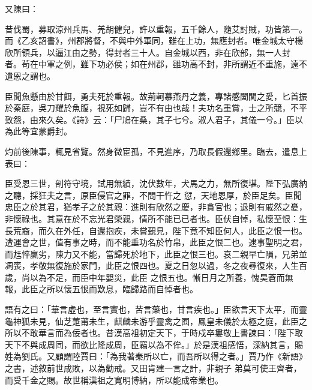 \begin{pinyinscope}
 又陳曰：



 昔伐蜀，募取涼州兵馬、羌胡健兒，許以重報，五千餘人，隨艾討賊，功皆第一。而《乙亥詔書》，州郡將督，不與中外軍同，雖在上功，無應封者。唯金城太守楊欣所領兵，以逼江由之勢，得封者三十人。自金城以西，非在欣部，無一人封
 者。茍在中軍之例，雖下功必侯；如在州郡，雖功高不封，非所謂近不重施，遠不遺恩之謂也。



 臣聞魚懸由於甘餌，勇夫死於重報。故荊軻慕燕丹之義，專諸感闔閭之愛，匕首振於秦庭，吳刀耀於魚腹，視死如歸，豈不有由也哉！夫功名重賞，士之所競，不平致怨，由來久矣。《詩》云：「尸鳩在桑，其子七兮。淑人君子，其儀一兮。」臣以為此等宜蒙爵封。



 灼前後陳事，輒見省覽。然身微宦孤，不見進序，乃取長假還鄉里。臨去，遣息上表曰：



 臣受恩三世，剖符守境，試用無績，沈伏數年，犬馬之力，無所復堪。陛下弘廣納之聽，採狂夫之言，原臣侵官之罪，不問干忤之
 愆，天地恩厚，於臣足矣。臣聞忠臣之於其君，猶孝子之於其親：進則有欣然之慶，非貪官也；退則有戚然之憂，非懷祿也。其意在於不忘光君榮親，情所不能已已者也。臣伏自悼，私懷至恨：生長荒裔，而久在外任，自還抱疾，未嘗覲見，陛下竟不知臣何人，此臣之恨一也。遭運會之世，值有事之時，而不能垂功名於竹帛，此臣之恨二也。逮事聖明之君，而尪悴羸劣，陳力又不能，當歸死於地下，此臣之恨三也。哀二親早亡隕，兄弟並凋喪，孝敬無復施於家門，此臣之恨四也。夏之日忽以過，冬之夜尋復來，人生百歲，尚以為不足，而臣中年嬰災，此臣
 之恨五也。慚日月之所養，愧昊蒼而無報，此臣之所以懷五恨而歎息，臨歸路而自悼者也。



 語有之曰：「華言虛也，至言實也，苦言藥也，甘言疾也。」臣欲言天下太平，而靈龜神狐未見，仙芝萐莆未生，麒麟未游乎靈禽之囿，鳳皇未儀於太極之庭，此臣之所以不敢華言而為佞者也。昔漢高祖初定天下，于時戍卒婁敬上書諫曰：「陛下取天下不與成周同，而欲比隆成周，臣竊以為不侔。」於是漢祖感悟，深納其言，賜姓為劉氏。又顧謂陸賈曰：「為我著秦所以亡，而吾所以得之者。」賈乃作《新語》之書，述敘前世成敗，以為勸戒。又田肯建一言之計，非親子
 弟莫可使王齊者，而受千金之賜。故世稱漢祖之寬明博納，所以能成帝業也。




\end{pinyinscope}
